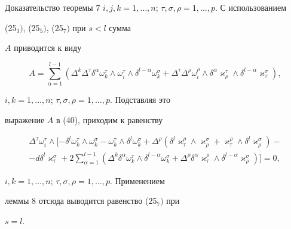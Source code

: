 \begin{pf*}{Доказательство теоремы 7}
$i,j,k=1,\dotsc,n$; $\tau,\sigma,\rho=1,\dotsc,p$. С использованием


(25${}_3)$, (25${}_5)$, (25${}_7)$  при $s<l$ сумма


$A$ приводится к виду


$$


A=\sum_{\alpha=1}^{l-1}(\Delta^k\Delta^{\tau}\delta^{\alpha}


\omega^{\tau}_k\wedge\omega^{\tau}_i\wedge\delta^{l-\alpha}


\omega^{\sigma}_k+\Delta^{\tau}\Delta^{\rho}\omega^{\rho}_i


\wedge\delta^{\alpha}\varkappa^{\tau}_{\rho}\wedge\delta^{l-\alpha}


\varkappa^{\sigma}_{\tau}),


$$


$i,k=1,\dotsc,n$; $\tau,\sigma,\rho=1,\dotsc,p$. Подставляя это


выражение $A$ в (40), приходим к равенству


\begin{multline*}


\Delta^{\tau}\omega^{\tau}_i\wedge[-\delta^l\omega^{\tau}_k\wedge


\omega^{\sigma}_k-\omega^{\tau}_k\wedge\delta^l\omega^{\sigma}_k+


\Delta^{\rho}(\delta^l\varkappa^{\rho}_{\tau}\wedge


\varkappa^{\sigma}_{\rho}+\varkappa^{\rho}_{\tau}\wedge\delta^l


\varkappa^{\sigma}_{\rho})-\\


%


-d\delta^l\varkappa^{\sigma}_{\tau}+


2\sum_{\alpha=1}^{l-1}(\Delta^k\delta^{\alpha}\omega^{\tau}_k\wedge


\delta^{l-\alpha}\omega^{\sigma}_k+


\Delta^{\rho}\delta^{\alpha}\varkappa^{\rho}_{\tau}\wedge


\delta^{l-\alpha}\varkappa^{\sigma}_{\rho})]=0,


\end{multline*}


$i,k=1,\dotsc,n$; $\tau,\sigma,\rho=1,\dotsc,p$. Применением


леммы 8 отсюда выводится равенство (25${}_7)$ при


$s=l$.


\end{pf*}





